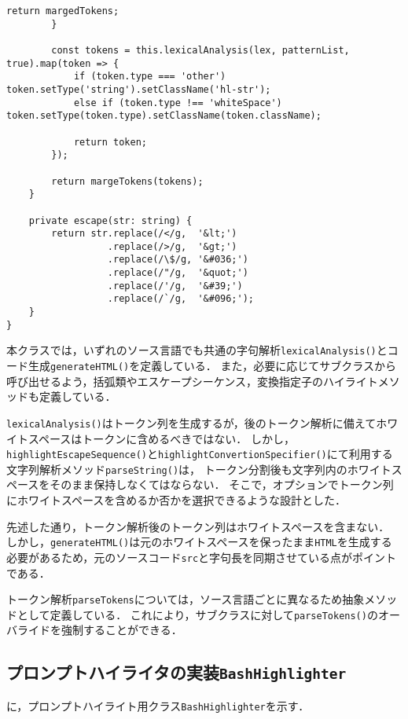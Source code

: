 \documentclass[autodetect-engine,dvi=dvipdfmx,ja=standard,
               a4j,11pt]{bxjsarticle}
\newcommand{\figref}[1]{\makebox{図~\ref{#1}}}
\begin{document}
\begin{lstlisting}[caption={ハイライタ基底クラス({\tt base.ts})}, label={prog:base}]
            return margedTokens;
        }

        const tokens = this.lexicalAnalysis(lex, patternList, true).map(token => {
            if (token.type === 'other')           token.setType('string').setClassName('hl-str');
            else if (token.type !== 'whiteSpace') token.setType(token.type).setClassName(token.className);

            return token;
        });

        return margeTokens(tokens);
    }

    private escape(str: string) {
        return str.replace(/</g,  '&lt;')
                  .replace(/>/g,  '&gt;')
                  .replace(/\$/g, '&#036;')
                  .replace(/"/g,  '&quot;')
                  .replace(/'/g,  '&#39;')
                  .replace(/`/g,  '&#096;');
    }
}
\end{lstlisting}

本クラスでは，いずれのソース言語でも共通の字句解析\verb|lexicalAnalysis()|とコード生成\verb|generateHTML()|を定義している．
また，必要に応じてサブクラスから呼び出せるよう，括弧類やエスケープシーケンス，変換指定子のハイライトメソッドも定義している．

\verb|lexicalAnalysis()|はトークン列を生成するが，後のトークン解析に備えてホワイトスペースはトークンに含めるべきではない．
しかし，\verb|highlightEscapeSequence()|と\verb|highlightConvertionSpecifier()|にて利用する文字列解析メソッド\verb|parseString()|は，
トークン分割後も文字列内のホワイトスペースをそのまま保持しなくてはならない．
そこで，オプションでトークン列にホワイトスペースを含めるか否かを選択できるような設計とした．

先述した通り，トークン解析後のトークン列はホワイトスペースを含まない．
しかし，\verb|generateHTML()|は元のホワイトスペースを保ったまま\verb|HTML|を生成する必要があるため，元のソースコード\verb|src|と字句長を同期させている点がポイントである．

トークン解析\verb|parseTokens|については，ソース言語ごとに異なるため抽象メソッドとして定義している．
これにより，サブクラスに対して\verb|parseTokens()|のオーバライドを強制することができる．

\subsection{プロンプトハイライタの実装{\tt BashHighlighter}}

\figref{prog:bash}に，プロンプトハイライト用クラス\verb|BashHighlighter|を示す．
\end{document}
